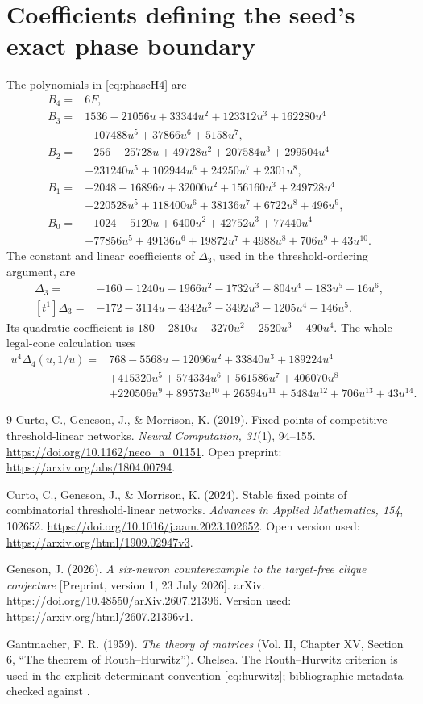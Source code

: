 \documentclass[11pt,a4paper]{article}
\theoremstyle{definition}\newtheorem{definition}[theorem]{Definition}
\theoremstyle{remark}\newtheorem{remark}[theorem]{Remark}
\begin{document}
\section{Coefficients defining the seed's exact phase boundary}\label{app:phase}
The polynomials in \eqref{eq:phaseH4} are
\begin{align*}
B_4={}&6F,\\
B_3={}&1536-21056u+33344u^2+123312u^3+162280u^4\\
      &+107488u^5+37866u^6+5158u^7,\\
B_2={}&-256-25728u+49728u^2+207584u^3+299504u^4\\
      &+231240u^5+102944u^6+24250u^7+2301u^8,\\
B_1={}&-2048-16896u+32000u^2+156160u^3+249728u^4\\
      &+220528u^5+118400u^6+38136u^7+6722u^8+496u^9,\\
B_0={}&-1024-5120u+6400u^2+42752u^3+77440u^4\\
      &+77856u^5+49136u^6+19872u^7+4988u^8+706u^9+43u^{10}.
\end{align*}
The constant and linear coefficients of $\Delta_3$, used in the threshold-ordering argument, are
\begin{align*}
[t^0]\Delta_3={}&-160-1240u-1966u^2-1732u^3-804u^4-183u^5-16u^6,\\
[t^1]\Delta_3={}&-172-3114u-4342u^2-3492u^3-1205u^4-146u^5.
\end{align*}
Its quadratic coefficient is $180-2810u-3270u^2-2520u^3-490u^4$.
The whole-legal-cone calculation uses
\begin{align*}
 u^4\Delta_4(u,1/u)={}&768-5568u-12096u^2+33840u^3+189224u^4\\
 &+415320u^5+574334u^6+561586u^7+406070u^8\\
 &+220506u^9+89573u^{10}+26594u^{11}+5484u^{12}
 +706u^{13}+43u^{14}.
\end{align*}

\begin{thebibliography}{9}
Curto, C., Geneson, J., \& Morrison, K. (2019).
Fixed points of competitive threshold-linear networks.
\emph{Neural Computation, 31}(1), 94--155.
\url{https://doi.org/10.1162/neco_a_01151}.
Open preprint: \url{https://arxiv.org/abs/1804.00794}.

Curto, C., Geneson, J., \& Morrison, K. (2024).
Stable fixed points of combinatorial threshold-linear networks.
\emph{Advances in Applied Mathematics, 154}, 102652.
\url{https://doi.org/10.1016/j.aam.2023.102652}.
Open version used: \url{https://arxiv.org/html/1909.02947v3}.

Geneson, J. (2026).
\emph{A six-neuron counterexample to the target-free clique conjecture}
[Preprint, version 1, 23 July 2026]. arXiv.
\url{https://doi.org/10.48550/arXiv.2607.21396}.
Version used: \url{https://arxiv.org/html/2607.21396v1}.

Gantmacher, F. R. (1959).
\emph{The theory of matrices} (Vol. II, Chapter XV, Section 6, ``The theorem of Routh--Hurwitz''). Chelsea.
The Routh--Hurwitz criterion is used in the explicit determinant convention
\eqref{eq:hurwitz}; bibliographic metadata checked against \cite{G2026}.
\end{thebibliography}
\end{document}
